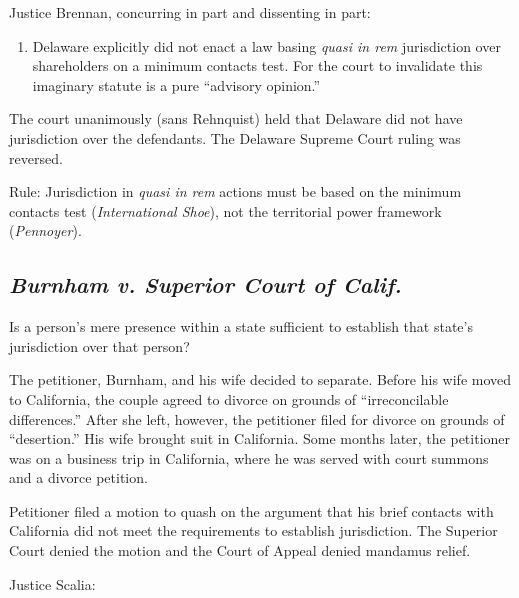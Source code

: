 Justice Brennan, concurring in part and dissenting in part:

\begin{enumerate}
\item
  Delaware explicitly did not enact a law basing \emph{quasi in rem}
  jurisdiction over shareholders on a minimum contacts test. For the
  court to invalidate this imaginary statute is a pure ``advisory
  opinion.''
\end{enumerate}

The court unanimously (sans Rehnquist) held that Delaware did not have
jurisdiction over the defendants. The Delaware Supreme Court ruling was
reversed.

Rule: Jurisdiction in \emph{quasi in rem} actions must be based on the minimum
contacts test (\emph{International Shoe}), not the territorial power
framework (\emph{Pennoyer}).

\subsection{\emph{Burnham v. Superior Court of Calif.}}

Is a person's mere presence within a state sufficient to establish that
state's jurisdiction over that person?

The petitioner, Burnham, and his wife decided to separate. Before his
wife moved to California, the couple agreed to divorce on grounds of
``irreconcilable differences.'' After she left, however, the petitioner
filed for divorce on grounds of ``desertion.'' His wife brought suit in
California. Some months later, the petitioner was on a business trip in
California, where he was served with court summons and a divorce
petition.

Petitioner filed a motion to quash on the argument that his brief
contacts with California did not meet the requirements to establish
jurisdiction. The Superior Court denied the motion and the Court of
Appeal denied mandamus relief.

Justice Scalia:

